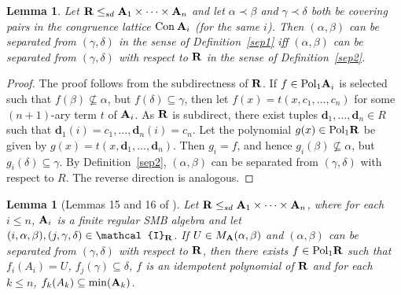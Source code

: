 \documentclass[11pt]{amsart}
\newcommand{\m}[1]{{\uppercase {\mathbf {#1}}}}
\newcommand{\vr}[1]{{\uppercase {\mathcal{#1}}}}
\newcommand{\poln}[2]{{\rm Pol_{#1}\m #2}}
\newcommand{\con}{{\rm Con\:}}
\newcommand{\cn}[1]{{\con\m {#1}}}
\newtheorem{lm}[thm]{Lemma}
\theoremstyle{definition}
\begin{document}
\begin{lm}\label{sep1insep2}
Let $\m R\leq_{sd}\m a_1\times\dots\times\m a_n$ and let $\alpha\prec \beta$ and $\gamma\prec\delta$ both be covering pairs in the congruence lattice $\cn a_i$ (for the same $i$). Then $(\alpha,\beta)$ can be separated from $(\gamma,\delta)$ in the sense of Definition~\ref{sep1} iff $(\alpha,\beta)$ can be separated from $(\gamma,\delta)$ with respect to $\m R$ in the sense of Definition~\ref{sep2}.
\end{lm}

\begin{proof}
The proof follows from the subdirectness of $\m R$. If $f\in \poln{1}{a}_i$ is selected such that $f(\beta)\nsubseteq\alpha$, but $f(\delta)\subseteq\gamma$, then let $f(x)=t(x,c_1,\dots,c_n)$ for some $(n+1)$-ary term $t$ of $\m a_i$. As $\m R$ is subdirect, there exist tuples $\mathbf{d}_1,\dots,\mathbf{d}_n\in R$ such that $\mathbf{d}_1(i)=c_1,\dots,\mathbf{d}_n(i)=c_n$. Let the polynomial $g(x)\in\poln{1}{R}$ be given by $g(x)=t(x,\mathbf{d}_1,\dots,\mathbf{d}_n)$. Then $g_i=f$, and hence $g_i(\beta)\nsubseteq\alpha$, but $g_i(\delta)\subseteq\gamma$. By Definition~\ref{sep2}, $(\alpha,\beta)$ can be separated from $(\gamma,\delta)$ with respect to $R$. The reverse direction is analogous.
\end{proof}

\begin{lm}[Lemmas 15 and 16 of \cite{BuSMB}]\label{septominimal}
Let $\m R\leq_{sd}\m a_1\times\dots\times\m a_n$, where for each $i\leq n$, $\m a_i$ is a finite regular SMB algebra and let $(i,\alpha,\beta),(j,\gamma,\delta)\in\vr i_{\m r}$. If $U\in M_{\m a}(\alpha,\beta)$ and $(\alpha,\beta)$ can be separated from $(\gamma,\delta)$ with respect to $\m r$, then there exists $f\in\poln{1}{r}$ such that $f_i(A_i)=U$, $f_j(\gamma)\subseteq\delta$, $f$ is an idempotent polynomial of $\m r$ and for each $k\leq n$, $f_k(A_k)\subseteq \mathrm{min}(\m a_k)$.
\end{lm}
\end{document}
